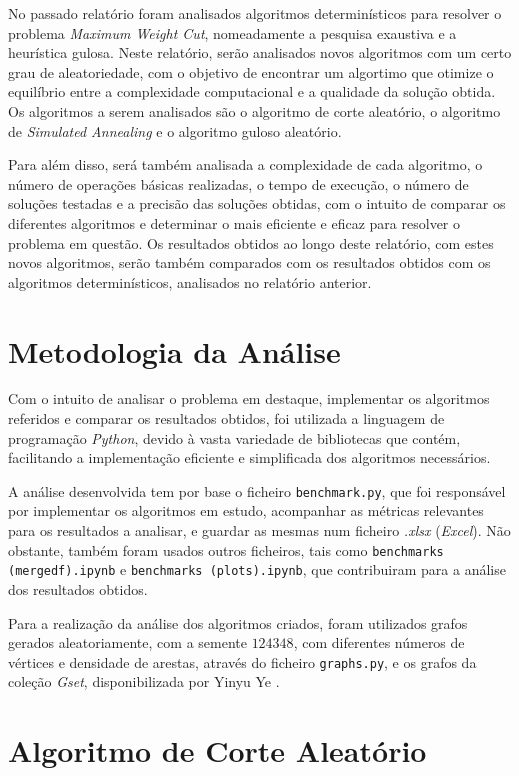 \documentclass[mirror, portugues]{revdetua}
\begin{document}
No passado relatório foram analisados algoritmos determinísticos para resolver o problema \textit{Maximum Weight Cut}, nomeadamente a pesquisa exaustiva e a heurística gulosa. Neste relatório, serão analisados novos algoritmos com um certo grau de aleatoriedade, com o objetivo de encontrar um algortimo que otimize o equilíbrio entre a complexidade computacional e a qualidade da solução obtida. Os algoritmos a serem analisados são o algoritmo de corte aleatório, o algoritmo de \textit{Simulated Annealing} e o algoritmo guloso aleatório.

Para além disso, será também analisada a complexidade de cada algoritmo, o número de operações básicas realizadas, o tempo de execução, o número de soluções testadas e a precisão das soluções obtidas, com o intuito de comparar os diferentes algoritmos e determinar o mais eficiente e eficaz para resolver o problema em questão. Os resultados obtidos ao longo deste relatório, com estes novos algoritmos, serão também comparados com os resultados obtidos com os algoritmos determinísticos, analisados no relatório anterior.

\section{Metodologia da Análise}

Com o intuito de analisar o problema em destaque, implementar os algoritmos referidos e comparar os resultados obtidos, foi utilizada a linguagem de programação \textit{Python}, devido à vasta variedade de bibliotecas que contém, facilitando a implementação eficiente e simplificada dos algoritmos necessários.

A análise desenvolvida tem por base o ficheiro \texttt{benchmark.py}, que foi responsável por implementar os algoritmos em estudo, acompanhar as métricas relevantes para os resultados a analisar, e guardar as mesmas num ficheiro \textit{.xlsx} (\textit{Excel}). Não obstante, também foram usados outros ficheiros, tais como \texttt{benchmarks (mergedf).ipynb} e \texttt{benchmarks (plots).ipynb}, que contribuiram para a análise dos resultados obtidos.

Para a realização da análise dos algoritmos criados, foram utilizados grafos gerados aleatoriamente, com a semente $124348$, com diferentes números de vértices e densidade de arestas, através do ficheiro \texttt{graphs.py}, e os grafos da coleção \textit{Gset}, disponibilizada por Yinyu Ye \cite{GS24}.

\section{Algoritmo de Corte Aleatório}
\end{document}
